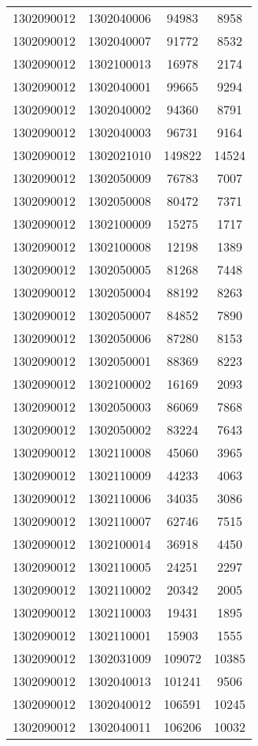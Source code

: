 \begin{longtable}{llcc}
1302090012 & 1302040006 & 94983 & 8958\\
1302090012 & 1302040007 & 91772 & 8532\\
1302090012 & 1302100013 & 16978 & 2174\\
1302090012 & 1302040001 & 99665 & 9294\\
1302090012 & 1302040002 & 94360 & 8791\\
1302090012 & 1302040003 & 96731 & 9164\\
1302090012 & 1302021010 & 149822 & 14524\\
1302090012 & 1302050009 & 76783 & 7007\\
1302090012 & 1302050008 & 80472 & 7371\\
1302090012 & 1302100009 & 15275 & 1717\\
1302090012 & 1302100008 & 12198 & 1389\\
1302090012 & 1302050005 & 81268 & 7448\\
1302090012 & 1302050004 & 88192 & 8263\\
1302090012 & 1302050007 & 84852 & 7890\\
1302090012 & 1302050006 & 87280 & 8153\\
1302090012 & 1302050001 & 88369 & 8223\\
1302090012 & 1302100002 & 16169 & 2093\\
1302090012 & 1302050003 & 86069 & 7868\\
1302090012 & 1302050002 & 83224 & 7643\\
1302090012 & 1302110008 & 45060 & 3965\\
1302090012 & 1302110009 & 44233 & 4063\\
1302090012 & 1302110006 & 34035 & 3086\\
1302090012 & 1302110007 & 62746 & 7515\\
1302090012 & 1302100014 & 36918 & 4450\\
1302090012 & 1302110005 & 24251 & 2297\\
1302090012 & 1302110002 & 20342 & 2005\\
1302090012 & 1302110003 & 19431 & 1895\\
1302090012 & 1302110001 & 15903 & 1555\\
1302090012 & 1302031009 & 109072 & 10385\\
1302090012 & 1302040013 & 101241 & 9506\\
1302090012 & 1302040012 & 106591 & 10245\\
1302090012 & 1302040011 & 106206 & 10032\\

\end{longtable}
